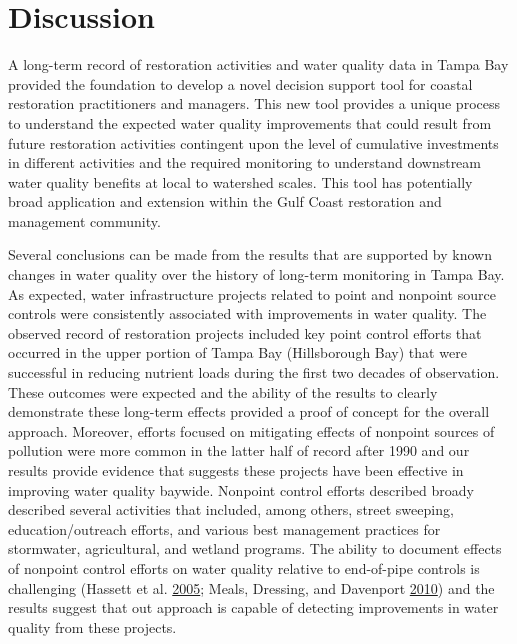 \documentclass[]{article}
\begin{document}
\hypertarget{discussion}{%
\section{Discussion}\label{discussion}}

A long-term record of restoration activities and water quality data in
Tampa Bay provided the foundation to develop a novel decision support
tool for coastal restoration practitioners and managers. This new tool
provides a unique process to understand the expected water quality
improvements that could result from future restoration activities
contingent upon the level of cumulative investments in different
activities and the required monitoring to understand downstream water
quality benefits at local to watershed scales. This tool has potentially
broad application and extension within the Gulf Coast restoration and
management community.

Several conclusions can be made from the results that are supported by
known changes in water quality over the history of long-term monitoring
in Tampa Bay. As expected, water infrastructure projects related to
point and nonpoint source controls were consistently associated with
improvements in water quality. The observed record of restoration
projects included key point control efforts that occurred in the upper
portion of Tampa Bay (Hillsborough Bay) that were successful in reducing
nutrient loads during the first two decades of observation. These
outcomes were expected and the ability of the results to clearly
demonstrate these long-term effects provided a proof of concept for the
overall approach. Moreover, efforts focused on mitigating effects of
nonpoint sources of pollution were more common in the latter half of
record after 1990 and our results provide evidence that suggests these
projects have been effective in improving water quality baywide.
Nonpoint control efforts described broady described several activities
that included, among others, street sweeping, education/outreach
efforts, and various best management practices for stormwater,
agricultural, and wetland programs. The ability to document effects of
nonpoint control efforts on water quality relative to end-of-pipe
controls is challenging (Hassett et al.
\protect\hyperlink{ref-Hassett05}{2005}; Meals, Dressing, and Davenport
\protect\hyperlink{ref-Meals10}{2010}) and the results suggest that out
approach is capable of detecting improvements in water quality from
these projects.
\end{document}

